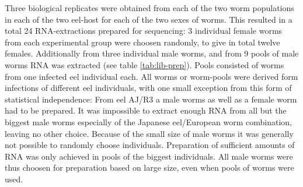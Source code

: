 Three biological replicates were obtained from each of the two worm
populations in each of the two eel-host for each of the two sexes of
worms. This resulted in a total 24 RNA-extractions prepared for
sequencing: 3 individual female worms from each experimental group
were choosen randomly, to give in total twelve females. Additionally
from three individual male worms, and from 9 pools of male worms RNA
was extracted (see table \ref{tab:lib-prep}). Pools consisted of worms
from one infected eel individual each. All worms or worm-pools were
derived form infections of different eel individuals, with one small
exception from this form of statistical independence: From eel AJ/R3 a
male worms as well as a female worm had to be prepared. It was
impossible to extract enough RNA from all but the biggest male worms
especially of the Japanese eel/European worm combination, leaving no
other choice. Because of the small size of male worms it was generally
not possible to randomly choose individuals. Preparation of sufficient
amounts of RNA was only achieved in pools of the biggest
individuals. All male worms were thus choosen for preparation based on
large size, even when pools of worms were used.

